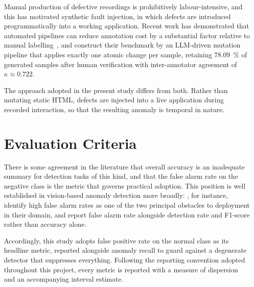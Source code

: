 Manual production of defective recordings is prohibitively
labour-intensive, and this has motivated synthetic fault injection, in
which defects are introduced programmatically into a working application.
Recent work has demonstrated that automated pipelines can reduce
annotation cost by a substantial factor relative to manual
labelling~\citep{guirobust}, and \citet{zhang2026beyond}
construct their benchmark by an LLM-driven mutation pipeline that applies
exactly one atomic change per sample, retaining \SI{78.09}{\percent} of
generated samples after human verification with inter-annotator agreement
of $\kappa \approx 0.722$.

The approach adopted in the present study differs from both. Rather than
mutating static HTML, defects are injected into a live application during
recorded interaction, so that the resulting anomaly is temporal in nature.


\section{Evaluation Criteria}
\label{sec:metrics}

There is some agreement in the literature that overall accuracy is an
inadequate summary for detection tasks of this kind, and that the false
alarm rate on the negative class is the metric that governs practical
adoption. This position is well established in vision-based anomaly
detection more broadly: \citet{tao2023psnet}, for instance,
identify high false alarm rates as one of the two principal obstacles to
deployment in their domain, and report false alarm rate alongside
detection rate and F1-score rather than accuracy alone.

Accordingly, this study adopts false positive rate on the normal class as
its headline metric, reported alongside anomaly recall to guard against a
degenerate detector that suppresses everything. Following the reporting
convention adopted throughout this project, every metric is reported with
a measure of dispersion and an accompanying interval estimate.


